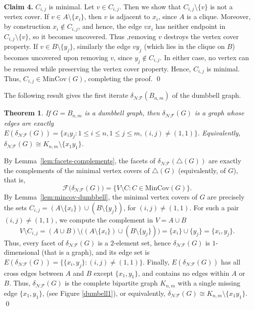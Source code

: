 \documentclass[12pt]{article}
\renewenvironment{proof}{{\noindent\bfseries Proof.}}{\qed}
\theoremstyle{plain}
\newtheorem{theorem}{Theorem}[section]
\theoremstyle{definition}
\newcommand{\F}{\mathcal{F}}
\newcommand{\MIN}{\mathrm{MinCov}}
\newcommand{\V}{V}
\newcommand{\A}{A}
\newcommand{\B}{B}
\begin{document}
\begin{proof}
		\smallskip\noindent
		\textbf{Claim 4.} $C_{i,j}$ is minimal. Let $v\in C_{i,j}$. Then we show that $C_{i,j}\setminus\{v\}$ is not a vertex cover.
		 If $v\in \A\setminus\{x_i\}$, then $v$ is adjacent to $x_i$, since $\A$ is a clique.
		Moreover, by construction $x_i\notin C_{i,j}$, and hence, the edge $vx_i$ has neither endpoint in $C_{i,j}\setminus\{v\}$,
		so it becomes uncovered. Thus ,removing $v$ destroys the vertex cover property.
		 	If $v\in \B\setminus\{y_j\}$, similarly the edge $vy_j$ (which lies in the clique on $\B$) becomes uncovered upon removing $v$,
		since $y_j\notin C_{i,j}$. In either case, no vertex can be removed while preserving the vertex cover property. Hence, $C_{i,j}$ is minimal. Thus,  $C_{i,j}\in \MIN(G)$, completing the proof.
	\end{proof}
	
	\medskip
	The following result gives the first iterate $\delta_{\mathcal{NF}}(B_{n,m})$ of the dumbbell graph.	
	\begin{theorem}\label{thm:delta1}
		If $G=B_{n,m}$ is a dumbbell graph, then $\delta_{\mathcal{NF}}(G)$ is a graph whose edges are exactly
		$E(\delta_{\mathcal{NF}}(G))  =  \bigl\{  x_i y_j  :  1\le i\le n, 1\le j\le m, (i,j)\neq(1,1) \bigr\}.$
		Equivalently, $\delta_{\mathcal{NF}}(G)\cong K_{n,m}\setminus\{x_1y_1\}$.
	\end{theorem}
	
	\begin{proof}
		 By Lemma~\ref{lem:facets-complements}, the facets of $\delta_{\mathcal{NF}}(\bigtriangleup(G))$ are exactly the complements of the minimal
		vertex covers of $\bigtriangleup(G)$ (equivalently, of $G$), that is,
		\[
		\F\bigl(\delta_{\mathcal{NF}}(G)\bigr)=\{ \V\setminus C  : C\in \MIN(G) \}.
		\]
		By Lemma~\ref{lem:mincov-dumbbell}, the minimal vertex covers of $G$ are precisely the sets
		 $C_{i,j}  =  (\A\setminus\{x_i\})\cup(\B\setminus\{y_j\})$, for $(i,j)\neq(1,1).$ For such a pair $(i,j)\neq(1,1)$, we compute the complement in $\V=\A\cup\B$
		\[
		\V\setminus C_{i,j}
		=
		(\A\cup\B)\setminus\bigl((\A\setminus\{x_i\})\cup(\B\setminus\{y_j\})\bigr)
		=
		\{x_i\}\cup\{y_j\}
		=
		\{x_i,y_j\}.
		\]
		Thus, every facet of $\delta_{\mathcal{NF}}(G)$ is a $2$-element set, hence $\delta_{\mathcal{NF}}(G)$ is $1$-dimensional (that is a graph), and its edge set is $E(\delta_{\mathcal{NF}}(G))=\bigl\{\{x_i,y_j\} : (i,j)\neq(1,1)\bigr\}.$ Finally, $E(\delta_{\mathcal{NF}}(G))$ has all cross edges between $\A$ and $\B$ except $\{x_1,y_1\}$, and contains no edges within $\A$ or $\B$. Thus, $\delta_{\mathcal{NF}}(G)$ is the complete bipartite graph $K_{n,m}$ with a single missing edge $\{x_1,y_1\}$, (see Figure \ref{dumbell1}), or equivalently, $\delta_{\mathcal{NF}}(G) \cong K_{n,m}\setminus\{x_1y_1\}.$ 
	\end{proof}
	
\end{document}
